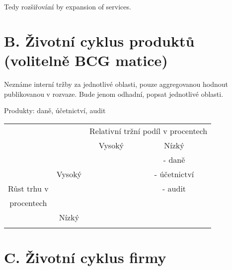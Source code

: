 Tedy rozšiřování by expansion of services. 

\newpage

\section*{B. Životní cyklus produktů (volitelně BCG matice)}
\label{sec:Zivotni cyklus produktu}

Neznáme interní tržby za jednotlivé oblasti, pouze aggregovanou hodnout publikovanou v rozvaze. Bude jenom odhadní, popsat jednotlivé oblasti.

Produkty: daně, účetnictví, audit

\begin{table}[!hbtp]
\centering
\begin{tabular}{cc|cc|}
\cline{3-4}
\multicolumn{1}{l}{} & \multicolumn{1}{l|}{} & \multicolumn{2}{c|}{Relativní tržní podíl v procentech} \\ \cline{3-4} 
\multicolumn{1}{l}{} & \multicolumn{1}{l|}{} & \multicolumn{1}{c|}{Vysoký} & Nízký \\ \hline
\multicolumn{1}{|c|}{} &  & \multicolumn{1}{c|}{\cellcolor[HTML]{67FD9A}} & - daně \\
\multicolumn{1}{|c|}{} & Vysoký & \multicolumn{1}{c|}{\cellcolor[HTML]{67FD9A}} & - účetnictví \\
\multicolumn{1}{|c|}{Růst trhu v} &  & \multicolumn{1}{c|}{\cellcolor[HTML]{67FD9A}} & - audit \\ \cline{2-4} 
\multicolumn{1}{|c|}{procentech} &  & \multicolumn{1}{c|}{} & \cellcolor[HTML]{FD6864}{\color[HTML]{000000} } \\
\multicolumn{1}{|c|}{} & Nízký & \multicolumn{1}{c|}{} & \cellcolor[HTML]{FD6864} \\
\multicolumn{1}{|c|}{} &  & \multicolumn{1}{c|}{} & \cellcolor[HTML]{FD6864} \\ \hline
\end{tabular}
\end{table}

\section*{C. Životní cyklus firmy}
\label{sec:Zivotni cyklus firmy}

